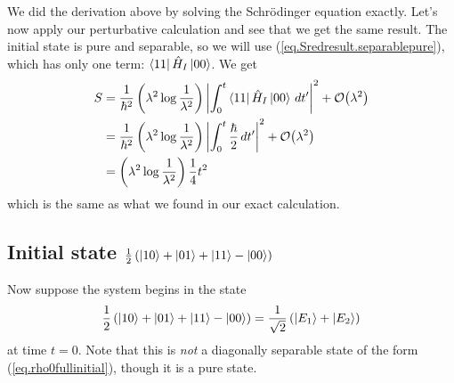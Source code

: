 We did the derivation above by solving the Schr\"odinger equation exactly. Let's now apply our perturbative calculation and see that we get the same result. 
The initial state is pure and separable, so we will use (\ref{eq.Sredresult.separablepure}), which has only one term: \(\left\langle11\right| \hat{H}_I \left|00\right\rangle\). We get
\begin{align*}
S &= \frac{1}{\hbar^2} \left(\lambda^2 \log \frac{1}{\lambda^2}\right) \left|\int_0^t \left\langle11\right| \hat{H}_I \left|00\right\rangle\,dt^\prime\right|^2 + \mathcal{O}{\left(\lambda^2\right)} \\
&= \frac{1}{\hbar^2} \left(\lambda^2 \log \frac{1}{\lambda^2}\right) \left|\int_0^t \frac{\hbar}{2}\,dt^\prime\right|^2 + \mathcal{O}{\left(\lambda^2\right)} \\
&= \left(\lambda^2 \log \frac{1}{\lambda^2}\right) \frac{1}{4} t^2
\end{align*}
which is the same as what we found in our exact calculation.

\subsection{Initial state \(\frac{1}{2}\left(\left|10\right\rangle + \left|01\right\rangle + \left|11\right\rangle - \left|00\right\rangle\right)\)}

Now suppose the system begins in the state
\[\frac{1}{2}\left(\left|10\right\rangle + \left|01\right\rangle + \left|11\right\rangle - \left|00\right\rangle\right) = \frac{1}{\sqrt{2}} \left(\left|E_1\right\rangle + \left|E_2\right\rangle\right)\]
at time \(t=0\). Note that this is \emph{not} a diagonally separable state of the form (\ref{eq.rho0fullinitial}), though it is a pure state.

